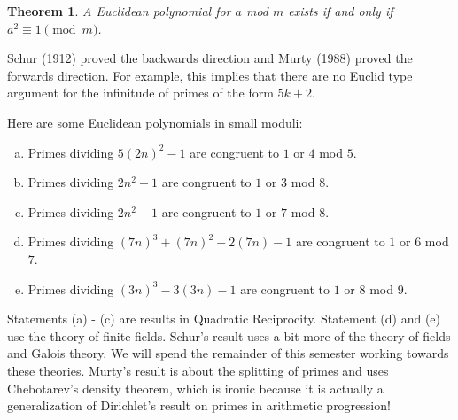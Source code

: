 \documentclass{article}
\newtheorem{theorem}[subsection]{Theorem}
\begin{document}
\begin{theorem}
    A Euclidean polynomial for $a$ mod $m$ exists if and only if $a^2\equiv 1\pmod{m}$.
\end{theorem}

Schur (1912) proved the backwards direction and Murty (1988) proved the forwards direction. For example, this implies that there are no Euclid type argument for the infinitude of primes of the form $5k+2$. 

Here are some Euclidean polynomials in small moduli:
\begin{enumerate}[(a)]
    \item Primes dividing $5(2n)^2 - 1$ are congruent to $1$ or $4$ mod $5$. 
    \item Primes dividing $2n^2+1$ are congruent to $1$ or $3$ mod $8$. 
    \item Primes dividing $2n^2-1$ are congruent to $1$ or $7$ mod $8$.
    \item Primes dividing $(7n)^3 + (7n)^2 - 2(7n) - 1$ are congruent to $1$ or $6$ mod $7$.
    \item Primes dividing $(3n)^3 - 3(3n) - 1$ are congruent to $1$ or $8$ mod $9$.
\end{enumerate}
Statements (a) - (c) are results in Quadratic Reciprocity. Statement (d) and (e) use the theory of finite fields. Schur's result uses a bit more of the theory of fields and Galois theory. We will spend the remainder of this semester working towards these theories. Murty's result is about the splitting of primes and uses Chebotarev's density theorem, which is ironic because it is actually a generalization of Dirichlet's result on primes in arithmetic progression! %
\end{document}
